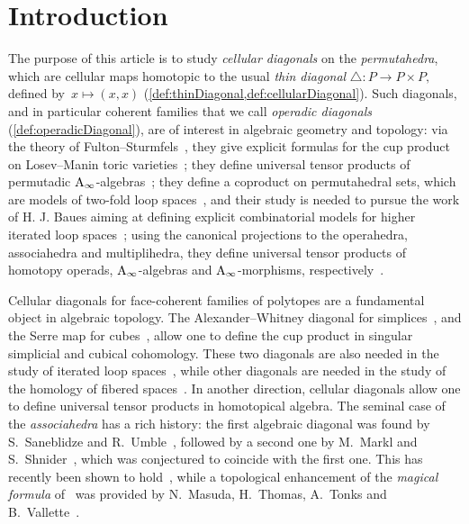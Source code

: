 \chapter*{Introduction} 
\label{s:introduction}

The purpose of this article is to study \emph{cellular diagonals} on the \emph{permutahedra}, which are cellular maps homotopic to the usual \emph{thin diagonal} ${\triangle : P \to P \times P,}$ defined by~${x \mapsto (x,x)}$ (\cref{def:thinDiagonal,def:cellularDiagonal}).
Such diagonals, and in particular coherent families that we call \emph{operadic diagonals} (\cref{def:operadicDiagonal}), are of interest in algebraic geometry and topology: via the theory of Fulton--Sturmfels~\cite{FultonSturmfels}, they give explicit formulas for the cup product on Losev--Manin toric varieties~\cite{LosevManin}; they define universal tensor products of permutadic $\mathrm{A}_\infty$-algebras~\cite{LodayRonco-permutads,Markl}; they define a coproduct on permutahedral sets, which are models of two-fold loop spaces~\cite{SaneblidzeUmble}, and their study is needed to pursue the work of H. J. Baues aiming at defining explicit combinatorial models for higher iterated loop spaces~\cite{Baues}; using the canonical projections to the operahedra, associahedra and multiplihedra, they define universal tensor products of homotopy operads, $\mathrm{A}_\infty$-algebras and $\mathrm{A}_\infty$-morphisms, respectively~\cite{LaplanteAnfossi,LaplanteAnfossiMazuir}.

Cellular diagonals for face-coherent families of polytopes are a fundamental object in algebraic topology. 
The Alexander--Whitney diagonal for simplices~\cite{EilenbergMacLane}, and the Serre map for cubes~\cite{Serre}, allow one to define the cup product in singular simplicial and cubical cohomology. 
These two diagonals are also needed in the study of iterated loop spaces~\cite{Baues}, while other diagonals are needed in the study of the homology of fibered spaces~\cite{Saneblidze-freeLoopFibration,SaneblidzeRivera, Proute}. 
In another direction, cellular diagonals allow one to define universal tensor products in homotopical algebra. 
The seminal case of the \emph{associahedra} has a rich history: the first algebraic diagonal was found by S.~Saneblidze and R.~Umble~\cite{SaneblidzeUmble}, followed by a second one by M.~Markl and S.~Shnider~\cite{MarklShnider}, which was conjectured to coincide with the first one. 
This has recently been shown to hold~\cite{SaneblidzeUmble-comparingDiagonals}, while a topological enhancement of the \emph{magical formula} of~\cite{MarklShnider} was provided by N.~Masuda, H.~Thomas, A.~Tonks and B.~Vallette~\cite{MasudaThomasTonksVallette}.

